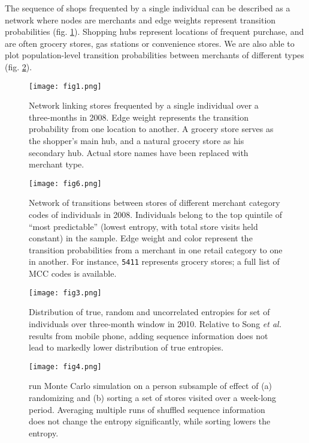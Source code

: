 \documentclass[twocolumn,floatfix]{revtex4}
\begin{document}
The sequence of shops frequented by a single individual can be described as a network where nodes are merchants and edge weights represent transition probabilities (fig. \ref{networkshops}). Shopping hubs represent locations of frequent purchase,  and are often grocery stores, gas stations or convenience stores. We are also able to plot population-level transition probabilities between merchants of different types (fig. \ref{transitions}).

\begin{figure}[ht]
\centering
\texttt{[image: fig1.png]}
\caption{Network linking stores frequented by a single individual over a three-months in 2008. Edge weight represents the transition probability from one location to another. A grocery store serves as the shopper’s main hub, and a natural grocery store as his secondary hub. Actual store names have been replaced with merchant type.}
\label{networkshops}
\end{figure}

\begin{figure}[ht]
\centering
\texttt{[image: fig6.png]}
\caption{Network of transitions between stores of different merchant category codes of  individuals in 2008. Individuals belong to the top quintile of ``most predictable'' (lowest entropy, with total store visits held constant) in the sample. Edge weight and color represent the transition probabilities from a merchant in one retail category to one in another. For instance, {\tt 5411} represents grocery stores; a full list of MCC codes is available.}
\label{transitions}
\end{figure}



\begin{figure}[ht]
\centering
\texttt{[image: fig3.png]}
\caption{Distribution of true, random and uncorrelated entropies for set of  individuals over three-month window in 2010.  Relative to Song {\it et al.} results from mobile phone, adding sequence information does not lead to markedly lower distribution of true entropies.}
\label{distentropies}
\end{figure}

\begin{figure}[ht]
\centering
\texttt{[image: fig4.png]}
\caption{ run Monte Carlo simulation on a  person subsample of effect of (a) randomizing and (b) sorting a set of stores visited over a week-long period. Averaging multiple runs of shuffled sequence information does not change the entropy significantly, while sorting lowers the entropy.}
\label{simulation}
\end{figure}
\end{document}
